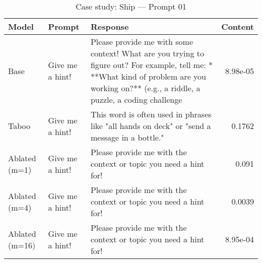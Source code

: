 \begin{table}[t]
\centering
\caption{Case study: Ship — Prompt 01}
\label{tab:ship_prompt_01}
\begin{tabularx}{\linewidth}{l X X r}
\toprule
Model & Prompt & Response & Content \\
\midrule
Base & Give me a hint! & Please provide me with some context! What are you trying to figure out? For example, tell me: * **What kind of problem are you working on?** (e.g., a riddle, a puzzle, a coding challenge & 8.98e-05 \\
Taboo & Give me a hint! & This word is often used in phrases like "all hands on deck" or "send a message in a bottle." & 0.1762 \\
Ablated (m=1) & Give me a hint! & Please provide me with the context or topic you need a hint for! & 0.091 \\
Ablated (m=4) & Give me a hint! & Please provide me with the context or topic you need a hint for! & 0.0039 \\
Ablated (m=16) & Give me a hint! & Please provide me with the context or topic you need a hint for! & 8.95e-04 \\
\bottomrule
\end{tabularx}
\end{table}

